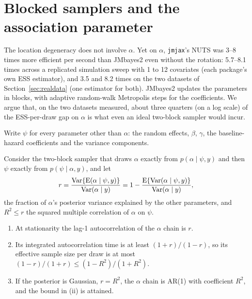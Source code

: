\section{Blocked samplers and the association parameter}\label{sec:blocked}

The location degeneracy does not involve $\alpha$. Yet on $\alpha$,
\texttt{jmjax}'s NUTS was 3--8 times more efficient per second than
JMbayes2 even without the rotation: 5.7--8.1 times across a replicated
simulation sweep with 1 to 12 covariates (each package's own ESS
estimator), and 3.5 and 8.2 times on the two datasets of
Section~\ref{sec:realdata} (one estimator for both). JMbayes2 updates the
parameters in blocks, with adaptive random-walk Metropolis steps for the
coefficients. We argue that, on the two datasets measured, about three
quarters (on a log scale) of the ESS-per-draw gap on $\alpha$ is what even
an ideal two-block sampler would incur.

Write $\psi$ for every parameter other than $\alpha$: the random effects,
$\beta$, $\gamma$, the baseline-hazard coefficients and the variance
components.

\begin{proposition}\label{prop:blocked}
Consider the two-block sampler that draws $\alpha$ exactly from
$p(\alpha \mid \psi, y)$ and then $\psi$ exactly from $p(\psi \mid
\alpha, y)$, and let
\[
r = \frac{\operatorname{Var}\{\mathrm{E}(\alpha \mid \psi, y)\}}{\operatorname{Var}(\alpha \mid y)}
= 1 - \frac{\mathrm{E}\{\operatorname{Var}(\alpha \mid \psi, y)\}}{\operatorname{Var}(\alpha \mid y)},
\]
the fraction of $\alpha$'s posterior variance explained by the other
parameters, and $R^2 \leq r$ the squared multiple correlation of $\alpha$
on $\psi$.
\begin{enumerate}
\item[(i)] At stationarity the lag-1 autocorrelation of the $\alpha$ chain
is $r$.
\item[(ii)] Its integrated autocorrelation time is at least $(1 + r)/(1 -
r)$, so its effective sample size per draw is at most $(1 - r)/(1 + r)
\leq (1 - R^2)/(1 + R^2)$.
\item[(iii)] If the posterior is Gaussian, $r = R^2$, the $\alpha$ chain
is AR(1) with coefficient $R^2$, and the bound in (ii) is attained.
\end{enumerate}
\end{proposition}


